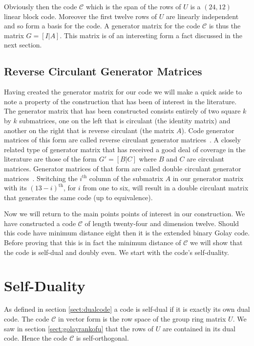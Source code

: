 Obviously then the code $\mathcal{C}$ which is the span of the rows of $U$ is a $(24,12)$ linear block code.
Moreover the first twelve rows of $U$ are linearly independent and so form a basis for the code.
A generator matrix for the code $\mathcal{C}$ is thus the matrix $G = [ I | A ]$.
This matrix is of an interesting form a fact discussed in the next section.

\subsection{Reverse Circulant Generator Matrices}
Having created the generator matrix for our code we will make a quick aside to note a property of the construction that has been of interest in the literature.
The generator matrix that has been constructed consists entirely of two square $k$ by $k$ submatrices, one on the left that is circulant (the identity matrix) and another on the right that is reverse circulant (the matrix $A$).
Code generator matrices of this form are called reverse circulant generator matrices~\cite[p.~377]{huf03}.
A closely related type of generator matrix that has received a good deal of coverage in the literature are those of the form $G' = [B|C]$ where $B$ and $C$ are  circulant matrices.
Generator matrices of that form are called double circulant generator matrices~\cite{gul98}.
Switching the $i^{\textrm{th}}$ column of the submatrix $A$ in our generator matrix with its $(13-i)^{\textrm{th}}$, for $i$ from one to six, will result in a double circulant matrix that generates the same code (up to equivalence).

Now we will return to the main points points of interest in our construction.
We have constructed a code $\mathcal{C}$ of length twenty-four and dimension twelve.
Should this code have minimum distance eight then it is the extended binary Golay code.
Before proving that this is in fact the minimum distance of $\mathcal{C}$ we will show that the code is self-dual and doubly even.
We start with the code's self-duality.


\section{Self-Duality}
As defined in section \ref{sect:dualcode} a code is self-dual if it is exactly its own dual code.
The code $\mathcal{C}$ in vector form is the row space of the group ring matrix $U$.
We saw in section \ref{sect:golayrankofu} that the rows of $U$ are contained in its dual code.
Hence the code $\mathcal{C}$ is self-orthogonal.

